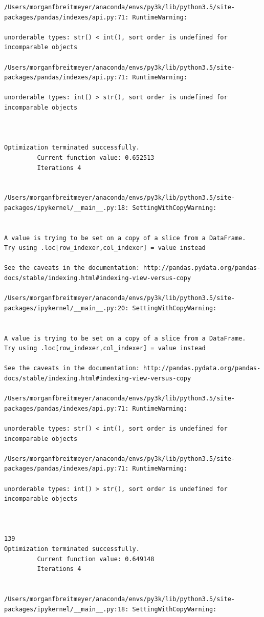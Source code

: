 \begin{lstlisting}
/Users/morganfbreitmeyer/anaconda/envs/py3k/lib/python3.5/site-packages/pandas/indexes/api.py:71: RuntimeWarning:

unorderable types: str() < int(), sort order is undefined for incomparable objects

/Users/morganfbreitmeyer/anaconda/envs/py3k/lib/python3.5/site-packages/pandas/indexes/api.py:71: RuntimeWarning:

unorderable types: int() > str(), sort order is undefined for incomparable objects



Optimization terminated successfully.
         Current function value: 0.652513
         Iterations 4


/Users/morganfbreitmeyer/anaconda/envs/py3k/lib/python3.5/site-packages/ipykernel/__main__.py:18: SettingWithCopyWarning:


A value is trying to be set on a copy of a slice from a DataFrame.
Try using .loc[row_indexer,col_indexer] = value instead

See the caveats in the documentation: http://pandas.pydata.org/pandas-docs/stable/indexing.html#indexing-view-versus-copy

/Users/morganfbreitmeyer/anaconda/envs/py3k/lib/python3.5/site-packages/ipykernel/__main__.py:20: SettingWithCopyWarning:


A value is trying to be set on a copy of a slice from a DataFrame.
Try using .loc[row_indexer,col_indexer] = value instead

See the caveats in the documentation: http://pandas.pydata.org/pandas-docs/stable/indexing.html#indexing-view-versus-copy

/Users/morganfbreitmeyer/anaconda/envs/py3k/lib/python3.5/site-packages/pandas/indexes/api.py:71: RuntimeWarning:

unorderable types: str() < int(), sort order is undefined for incomparable objects

/Users/morganfbreitmeyer/anaconda/envs/py3k/lib/python3.5/site-packages/pandas/indexes/api.py:71: RuntimeWarning:

unorderable types: int() > str(), sort order is undefined for incomparable objects



139
Optimization terminated successfully.
         Current function value: 0.649148
         Iterations 4


/Users/morganfbreitmeyer/anaconda/envs/py3k/lib/python3.5/site-packages/ipykernel/__main__.py:18: SettingWithCopyWarning:



\end{lstlisting}
